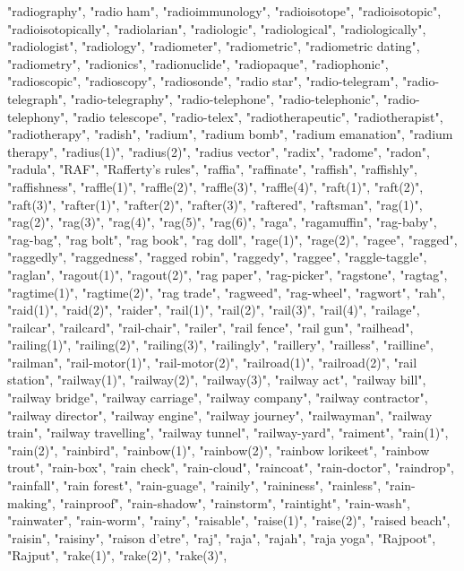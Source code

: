 "radiography",
"radio ham",
"radioimmunology",
"radioisotope",
"radioisotopic",
"radioisotopically",
"radiolarian",
"radiologic",
"radiological",
"radiologically",
"radiologist",
"radiology",
"radiometer",
"radiometric",
"radiometric dating",
"radiometry",
"radionics",
"radionuclide",
"radiopaque",
"radiophonic",
"radioscopic",
"radioscopy",
"radiosonde",
"radio star",
"radio-telegram",
"radio-telegraph",
"radio-telegraphy",
"radio-telephone",
"radio-telephonic",
"radio-telephony",
"radio telescope",
"radio-telex",
"radiotherapeutic",
"radiotherapist",
"radiotherapy",
"radish",
"radium",
"radium bomb",
"radium emanation",
"radium therapy",
"radius(1)",
"radius(2)",
"radius vector",
"radix",
"radome",
"radon",
"radula",
"RAF",
"Rafferty's rules",
"raffia",
"raffinate",
"raffish",
"raffishly",
"raffishness",
"raffle(1)",
"raffle(2)",
"raffle(3)",
"raffle(4)",
"raft(1)",
"raft(2)",
"raft(3)",
"rafter(1)",
"rafter(2)",
"rafter(3)",
"raftered",
"raftsman",
"rag(1)",
"rag(2)",
"rag(3)",
"rag(4)",
"rag(5)",
"rag(6)",
"raga",
"ragamuffin",
"rag-baby",
"rag-bag",
"rag bolt",
"rag book",
"rag doll",
"rage(1)",
"rage(2)",
"ragee",
"ragged",
"raggedly",
"raggedness",
"ragged robin",
"raggedy",
"raggee",
"raggle-taggle",
"raglan",
"ragout(1)",
"ragout(2)",
"rag paper",
"rag-picker",
"ragstone",
"ragtag",
"ragtime(1)",
"ragtime(2)",
"rag trade",
"ragweed",
"rag-wheel",
"ragwort",
"rah",
"raid(1)",
"raid(2)",
"raider",
"rail(1)",
"rail(2)",
"rail(3)",
"rail(4)",
"railage",
"railcar",
"railcard",
"rail-chair",
"railer",
"rail fence",
"rail gun",
"railhead",
"railing(1)",
"railing(2)",
"railing(3)",
"railingly",
"raillery",
"railless",
"railline",
"railman",
"rail-motor(1)",
"rail-motor(2)",
"railroad(1)",
"railroad(2)",
"rail station",
"railway(1)",
"railway(2)",
"railway(3)",
"railway act",
"railway bill",
"railway bridge",
"railway carriage",
"railway company",
"railway contractor",
"railway director",
"railway engine",
"railway journey",
"railwayman",
"railway train",
"railway travelling",
"railway tunnel",
"railway-yard",
"raiment",
"rain(1)",
"rain(2)",
"rainbird",
"rainbow(1)",
"rainbow(2)",
"rainbow lorikeet",
"rainbow trout",
"rain-box",
"rain check",
"rain-cloud",
"raincoat",
"rain-doctor",
"raindrop",
"rainfall",
"rain forest",
"rain-guage",
"rainily",
"raininess",
"rainless",
"rain-making",
"rainproof",
"rain-shadow",
"rainstorm",
"raintight",
"rain-wash",
"rainwater",
"rain-worm",
"rainy",
"raisable",
"raise(1)",
"raise(2)",
"raised beach",
"raisin",
"raisiny",
"raison d'etre",
"raj",
"raja",
"rajah",
"raja yoga",
"Rajpoot",
"Rajput",
"rake(1)",
"rake(2)",
"rake(3)",
